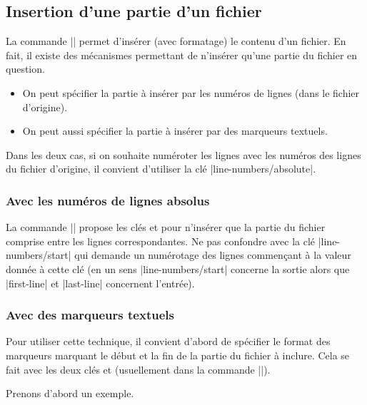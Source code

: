 \documentclass[dvipsnames,svgnames]{article}
\begin{document}
\bigskip
\subsection{Insertion d'une partie d'un fichier}

\label{part-of-a-file}


La commande |\PitonInputFile| permet d'insérer (avec formatage) le contenu d'un fichier. En fait, il existe des
mécanismes permettant de n'insérer qu'une partie du fichier en question.
\begin{itemize}
\item On peut spécifier la partie à insérer par les numéros de lignes (dans le fichier d'origine).
\item On peut aussi spécifier la partie à insérer par des marqueurs textuels.
\end{itemize}
Dans les deux cas, si on souhaite numéroter les lignes avec les numéros des lignes du fichier d'origine, il
convient d'utiliser la clé |line-numbers/absolute|.

\subsubsection{Avec les numéros de lignes absolus}

La commande |\PitonInputFile| propose les clés  et  pour n'insérer que
la partie du fichier comprise entre les lignes correspondantes. Ne pas confondre avec la clé |line-numbers/start|
qui demande un numérotage des lignes commençant à la valeur donnée à cette clé (en un sens |line-numbers/start|
concerne la sortie alors que |first-line| et |last-line| concernent l'entrée).


\subsubsection{Avec des marqueurs textuels}



Pour utiliser cette technique, il convient d'abord de spécifier le format des marqueurs marquant le début et la fin
de la partie du fichier à inclure. Cela se fait avec les deux clés  et
 (usuellement dans la commande |\PitonOptions|). 

\medskip
Prenons d'abord un exemple.
\end{document}
